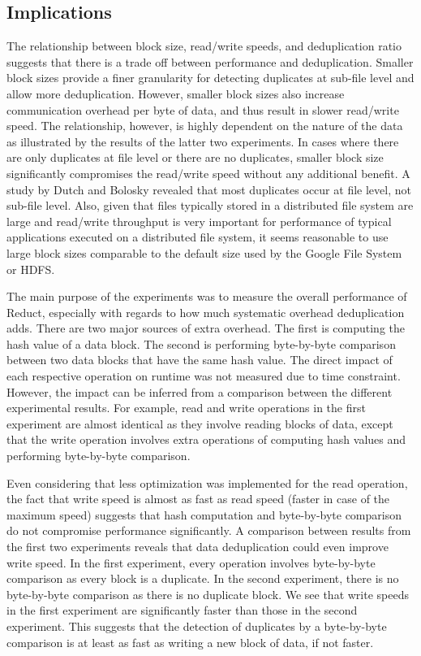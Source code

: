 \documentclass[11pt,twocolumn]{article}
\begin{document}
\subsection{Implications}\label{result:deduplication}
The relationship between block size, read/write speeds, and deduplication ratio suggests that there is a trade off between performance and deduplication. Smaller block sizes provide a finer granularity for detecting duplicates at sub-file level and allow more deduplication. However, smaller block sizes also increase communication overhead per byte of data, and thus result in slower read/write speed. The relationship, however, is highly dependent on the nature of the data as illustrated by the results of the latter two experiments. In cases where there are only duplicates at file level or there are no duplicates, smaller block size significantly compromises the read/write speed without any additional benefit. A study by Dutch and Bolosky revealed that most duplicates occur at file level, not sub-file level\cite{microsoft}. Also, given that files typically stored in a distributed file system are large and read/write throughput is very important for performance of typical applications executed on a distributed file system, it seems reasonable to use large block sizes comparable to the default size used by the Google File System or HDFS. 

The main purpose of the experiments was to measure the overall performance of Reduct, especially with regards to how much systematic overhead deduplication adds. There are two major sources of extra overhead. The first is computing the hash value of a data block. The second is performing byte-by-byte comparison between two data blocks that have the same hash value. The direct impact of each respective operation on runtime was not measured due to time constraint.  However, the impact can be inferred from a comparison between the different experimental results. For example, read and write operations in the first experiment are almost identical as they involve reading blocks of data, except that the write operation involves extra operations of computing hash values and performing byte-by-byte comparison. 

Even considering that less optimization was implemented for the read operation, the fact that write speed is almost as fast as read speed (faster in case of the maximum speed) suggests that hash computation and byte-by-byte comparison do not compromise performance significantly. A comparison between results from the first two experiments reveals that data deduplication could even improve write speed. In the first experiment, every operation involves byte-by-byte comparison as every block is a duplicate.  In the second experiment, there is no byte-by-byte comparison as there is no duplicate block. We see that write speeds in the first experiment are significantly faster than those in the second experiment. This suggests that the detection of duplicates by a byte-by-byte comparison is at least as fast as writing a new block of data, if not faster.
\end{document}
